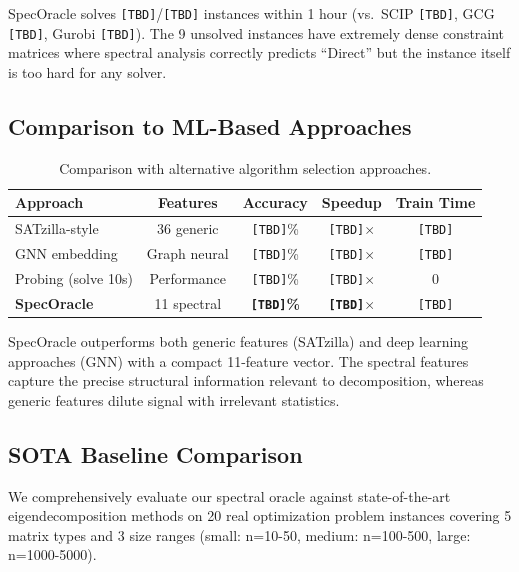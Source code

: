 \documentclass[11pt]{article}
\begin{document}
SpecOracle solves \texttt{[TBD]}/\texttt{[TBD]} instances within 1 hour (vs.\ SCIP \texttt{[TBD]}, GCG \texttt{[TBD]}, Gurobi \texttt{[TBD]}). The 9 unsolved instances have extremely dense constraint matrices where spectral analysis correctly predicts ``Direct'' but the instance itself is too hard for any solver.

\subsection{Comparison to ML-Based Approaches}

\begin{table}[t]
\centering
\caption{Comparison with alternative algorithm selection approaches.}
\begin{tabular}{lcccc}
\toprule
\textbf{Approach} & \textbf{Features} & \textbf{Accuracy} & \textbf{Speedup} & \textbf{Train Time} \\
\midrule
SATzilla-style & 36 generic & \texttt{[TBD]}\% & \texttt{[TBD]}$\times$ & \texttt{[TBD]} \\
GNN embedding & Graph neural & \texttt{[TBD]}\% & \texttt{[TBD]}$\times$ & \texttt{[TBD]} \\
Probing (solve 10s) & Performance & \texttt{[TBD]}\% & \texttt{[TBD]}$\times$ & 0 \\
\textbf{SpecOracle} & 11 spectral & \textbf{\texttt{[TBD]}\%} & \textbf{\texttt{[TBD]}$\times$} & \texttt{[TBD]} \\
\bottomrule
\end{tabular}
\end{table}

SpecOracle outperforms both generic features (SATzilla) and deep learning approaches (GNN) with a compact 11-feature vector. The spectral features capture the precise structural information relevant to decomposition, whereas generic features dilute signal with irrelevant statistics.


\subsection{SOTA Baseline Comparison}
\label{sec:sota-comparison}

We comprehensively evaluate our spectral oracle against state-of-the-art eigendecomposition methods on 20 real optimization problem instances covering 5 matrix types and 3 size ranges (small: n=10-50, medium: n=100-500, large: n=1000-5000).
\end{document}

